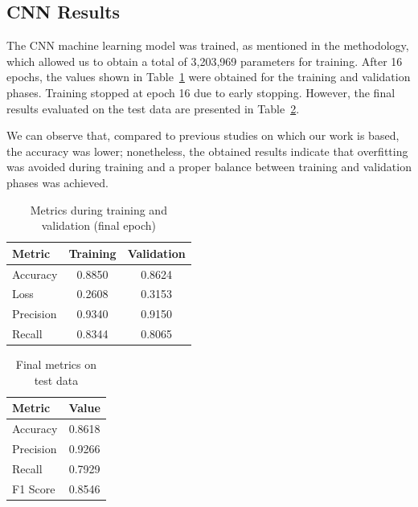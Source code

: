 \subsection{CNN Results}
\label{sec:cnn_results}

The CNN machine learning model was trained, as mentioned in the methodology, which allowed us to obtain a total of 3,203,969 parameters for training. After 16 epochs, the values shown in Table~\ref{tab:train_metrics} were obtained for the training and validation phases. Training stopped at epoch 16 due to early stopping. However, the final results evaluated on the test data are presented in Table~\ref{tab:test_metrics}.

We can observe that, compared to previous studies on which our work is based, the accuracy was lower; nonetheless, the obtained results indicate that overfitting was avoided during training and a proper balance between training and validation phases was achieved.

\begin{table}[h]
    \centering
    \caption{Metrics during training and validation (final epoch)}
    \label{tab:train_metrics}
    \begin{tabular}{lcc}
        \toprule
        Metric         & Training & Validation \\
        \midrule
        Accuracy       & 0.8850   & 0.8624     \\
        Loss           & 0.2608   & 0.3153     \\
        Precision      & 0.9340   & 0.9150     \\
        Recall         & 0.8344   & 0.8065     \\
        \bottomrule
    \end{tabular}
\end{table}

\begin{table}[h]
    \centering
    \caption{Final metrics on test data}
    \label{tab:test_metrics}
    \begin{tabular}{lc}
        \toprule
        Metric    & Value   \\
        \midrule
        Accuracy  & 0.8618  \\
        Precision & 0.9266  \\
        Recall    & 0.7929  \\
        F1 Score  & 0.8546  \\
        \bottomrule
    \end{tabular}
\end{table}

